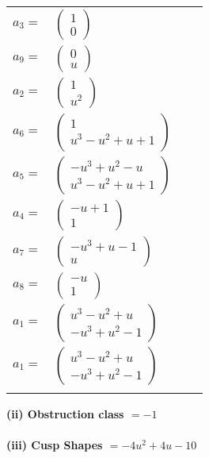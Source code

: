 \documentclass[1p]{elsarticle_modified}
\theoremstyle{definition}
\begin{document}
\begin{tabular}{m{7pt} m{180pt} m{7pt} m{180pt} }
\flushright $a_{3}=$&$\begin{pmatrix}1\\0\end{pmatrix}$ \\
\flushright $a_{9}=$&$\begin{pmatrix}0\\u\end{pmatrix}$ \\
\flushright $a_{2}=$&$\begin{pmatrix}1\\u^2\end{pmatrix}$ \\
\flushright $a_{6}=$&$\begin{pmatrix}1\\u^3- u^2+u+1\end{pmatrix}$ \\
\flushright $a_{5}=$&$\begin{pmatrix}- u^3+u^2- u\\u^3- u^2+u+1\end{pmatrix}$ \\
\flushright $a_{4}=$&$\begin{pmatrix}- u+1\\1\end{pmatrix}$ \\
\flushright $a_{7}=$&$\begin{pmatrix}- u^3+u-1\\u\end{pmatrix}$ \\
\flushright $a_{8}=$&$\begin{pmatrix}- u\\1\end{pmatrix}$ \\
\flushright $a_{1}=$&$\begin{pmatrix}u^3- u^2+u\\- u^3+u^2-1\end{pmatrix}$\\ \flushright $a_{1}=$&$\begin{pmatrix}u^3- u^2+u\\- u^3+u^2-1\end{pmatrix}$\\&\end{tabular}
\flushleft \textbf{(ii) Obstruction class $= -1$}\\~\\
\flushleft \textbf{(iii) Cusp Shapes $= -4 u^2+4 u-10$}\\~\\
\end{document}
